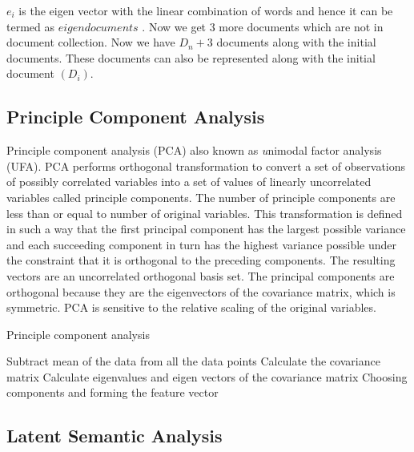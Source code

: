\documentclass{bmcart}
\begin{document}
$e_i$ is the eigen vector with the linear combination of words and hence it can be termed as $eigen documents$ . Now we get 3 more documents which are not in document collection. Now we have $D_n+3$ documents along with the initial documents. These documents can also be represented along with the initial document $(D_i)$.

\subsection{Principle Component Analysis}
\label{ssec:pca}
Principle component analysis (PCA) also known as {\textit unimodal factor analysis (UFA)}. 	PCA performs orthogonal transformation to convert a set of observations of possibly correlated variables into a set of values of linearly uncorrelated variables called principle components. The number of principle components are less than or equal to number of original variables. This transformation is defined in such a way that the first principal component has the largest possible  variance and each succeeding component in turn has the highest variance possible under the constraint that it is orthogonal to the preceding components. The resulting vectors are an uncorrelated orthogonal basis set. The principal components are orthogonal because they are the eigenvectors of the covariance matrix, which is symmetric. PCA is sensitive to the relative scaling of the original variables.

\begin{algorithm}[h!tb]
\caption{Principle component analysis}
\label{algo:pca}
\begin{algorithmic}[1]
\STATE {}
\STATE Subtract mean of the data from all the data points
\STATE Calculate the covariance matrix
\STATE Calculate eigenvalues and eigen vectors of the covariance matrix
\STATE Choosing components and forming the feature vector
\end{algorithmic}
\end{algorithm}


\subsection{Latent Semantic Analysis}
\label{ssec:LSA}
\end{document}
